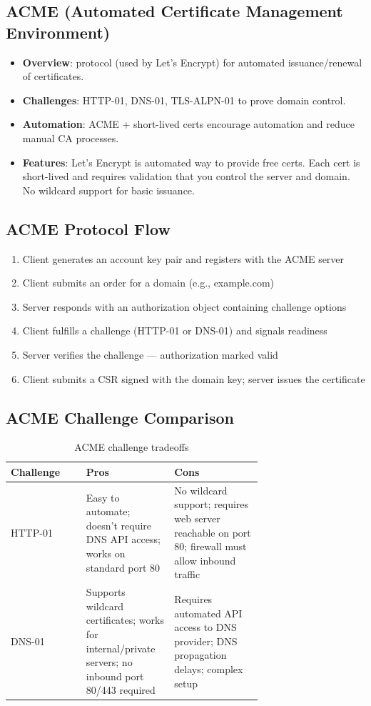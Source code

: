 \documentclass[11pt]{article}
\begin{document}
\subsection{ACME (Automated Certificate Management Environment)}
\begin{itemize}
  \item \textbf{Overview}: protocol (used by Let's Encrypt) for automated issuance/renewal of certificates.
  
  \item \textbf{Challenges}: HTTP-01, DNS-01, TLS-ALPN-01 to prove domain control.
  
  \item \textbf{Automation}: ACME + short-lived certs encourage automation and reduce manual CA processes.
  
  \item \textbf{Features}: Let's Encrypt is automated way to provide free certs. Each cert is short-lived and requires validation that you control the server and domain. No wildcard support for basic issuance.
\end{itemize}

\subsection{ACME Protocol Flow}
\begin{enumerate}
  \item Client generates an account key pair and registers with the ACME server
  \item Client submits an order for a domain (e.g., example.com)
  \item Server responds with an authorization object containing challenge options
  \item Client fulfills a challenge (HTTP-01 or DNS-01) and signals readiness
  \item Server verifies the challenge --- authorization marked valid
  \item Client submits a CSR signed with the domain key; server issues the certificate
\end{enumerate}

\subsection{ACME Challenge Comparison}
\begin{table}[h]
\centering
\begin{tabular}{l p{0.35\linewidth} p{0.35\linewidth}}
\toprule
\textbf{Challenge} & \textbf{Pros} & \textbf{Cons} \\
\midrule
HTTP-01 & Easy to automate; doesn't require DNS API access; works on standard port 80 & No wildcard support; requires web server reachable on port 80; firewall must allow inbound traffic \\
DNS-01 & Supports wildcard certificates; works for internal/private servers; no inbound port 80/443 required & Requires automated API access to DNS provider; DNS propagation delays; complex setup \\
\bottomrule
\end{tabular}
\caption{ACME challenge tradeoffs}
\end{table}
\end{document}
